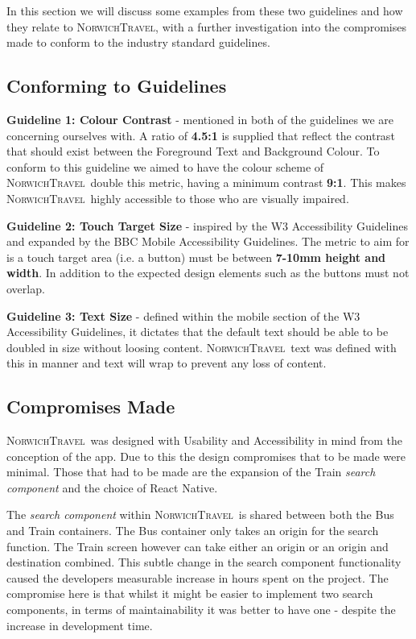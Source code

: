 \documentclass[cmpstyle]{ueacmpstyle}
\newcommand{\nt}{\textsc{NorwichTravel}}
\begin{document}
	In this section we will discuss some examples from these two guidelines and how they relate to \nt, with a further investigation into the compromises made to conform to the industry standard guidelines.
	
		\subsection{Conforming to Guidelines} \label{sec:conform}
		\textbf{Guideline 1: Colour Contrast} - mentioned in both of the guidelines we are concerning ourselves with. A ratio of \textbf{4.5:1} is supplied that reflect the contrast that should exist between the Foreground Text and Background Colour. To conform to this guideline we aimed to have the colour scheme of \nt \ double this metric, having a minimum contrast \textbf{9:1}. This makes \nt \ highly accessible to those who are visually impaired.
		
		\textbf{Guideline 2: Touch Target Size} - inspired by the W3 Accessibility Guidelines and expanded by the BBC Mobile Accessibility Guidelines. The metric to aim for is a touch target area (i.e. a button) must be between \textbf{7-10mm height and width}. In addition to the expected design elements such as the buttons must not overlap.
		
		\textbf{Guideline 3: Text Size} - defined within the mobile section of the W3 Accessibility Guidelines, it dictates that the default text should be able to be doubled in size without loosing content. \nt \ text was defined with this in manner and text will wrap to prevent any loss of content.
		
		\subsection{Compromises Made} \label{sec:comp}
		\nt \ was designed with Usability and Accessibility in mind from the conception of the app. Due to this the design compromises that to be made were minimal. Those that had to be made are the expansion of the Train \textit{search component} and the choice of React Native. 
		
		The \textit{search component} within \nt \ is shared between both the Bus and Train containers. The Bus container only takes an origin for the search function. The Train screen however can take either an origin or an origin and destination combined. This subtle change in the search component functionality caused the developers measurable increase in hours spent on the project. The compromise here is that whilst it might be easier to implement two search components, in terms of maintainability it was better to have one - despite the increase in development time.
		
\end{document}
